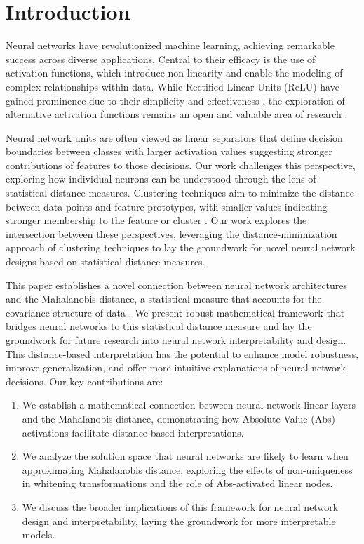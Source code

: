 \section{Introduction}

Neural networks have revolutionized machine learning, achieving remarkable success across diverse applications. Central to their efficacy is the use of activation functions, which introduce non-linearity and enable the modeling of complex relationships within data. While Rectified Linear Units (ReLU) have gained prominence due to their simplicity and effectiveness \citep{nair2010rectified}, the exploration of alternative activation functions remains an open and valuable area of research \citep{ramachandran2017searching}.

Neural network units are often viewed as linear separators that define decision boundaries between classes \citep{minsky1969perceptrons} with larger activation values suggesting stronger contributions of features to those decisions. Our work challenges this perspective, exploring how individual neurons can be understood through the lens of statistical distance measures. Clustering techniques aim to minimize the distance between data points and feature prototypes, with smaller values indicating stronger membership to the feature or cluster \citep{macqueen1967methods}. Our work explores the intersection between these perspectives, leveraging the distance-minimization approach of clustering techniques to lay the groundwork for novel neural network designs based on statistical distance measures.

This paper establishes a novel connection between neural network architectures and the Mahalanobis distance, a statistical measure that accounts for the covariance structure of data \citep{mahalanobis1936generalized}. We present robust mathematical framework that bridges neural networks to this statistical distance measure and lay the groundwork for future research into neural network interpretability and design. This distance-based interpretation has the potential to enhance model robustness, improve generalization, and offer more intuitive explanations of neural network decisions. Our key contributions are:

\begin{enumerate}
    \item We establish a mathematical connection between neural network linear layers and the Mahalanobis distance, demonstrating how Absolute Value (Abs) activations facilitate distance-based interpretations.
    \item We analyze the solution space that neural networks are likely to learn when approximating Mahalanobis distance, exploring the effects of non-uniqueness in whitening transformations and the role of Abs-activated linear nodes.
    \item We discuss the broader implications of this framework for neural network design and interpretability, laying the groundwork for more interpretable models.
\end{enumerate}
